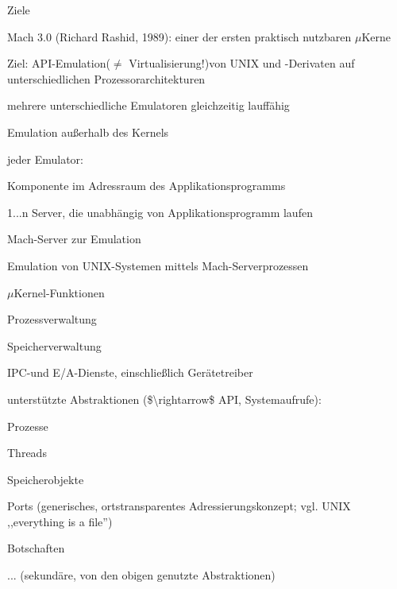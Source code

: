 \documentclass[a4paper]{article}
\begin{document}
\begin{multicols}{3}
    Ziele

    \begin{itemize*}
        \item
        Mach 3.0 (Richard Rashid, 1989): einer der ersten praktisch nutzbaren
        $\mu$Kerne
        \item
        Ziel: API-Emulation($\not =$ Virtualisierung!)von UNIX und -Derivaten auf
        unterschiedlichen Prozessorarchitekturen
        \item
        mehrere unterschiedliche Emulatoren gleichzeitig lauffähig
        \begin{itemize*}
            \item Emulation außerhalb des Kernels
            \item jeder Emulator: \begin{itemize*} \item   Komponente im Adressraum des Applikationsprogramms \item   1...n Server, die unabhängig von Applikationsprogramm laufen \end{itemize*}
        \end{itemize*}
    \end{itemize*}

    Mach-Server zur Emulation

    \begin{itemize*}
        \item
        \item
        Emulation von UNIX-Systemen mittels Mach-Serverprozessen
    \end{itemize*}

    $\mu$Kernel-Funktionen

    \begin{enumerate*}
        \item
        Prozessverwaltung
        \item
        Speicherverwaltung
        \item
        IPC-und E/A-Dienste, einschließlich Gerätetreiber
    \end{enumerate*}

    unterstützte Abstraktionen (\$\textbackslash rightarrow\$ API,
    Systemaufrufe):

    \begin{enumerate*}
        \item
        Prozesse
        \item
        Threads
        \item
        Speicherobjekte
        \item
        Ports (generisches, ortstransparentes Adressierungskonzept; vgl. UNIX
        ,,everything is a file'')
        \item
        Botschaften
        \item
        ... (sekundäre, von den obigen genutzte Abstraktionen)
    \end{enumerate*}


\end{multicols}
\end{document}
